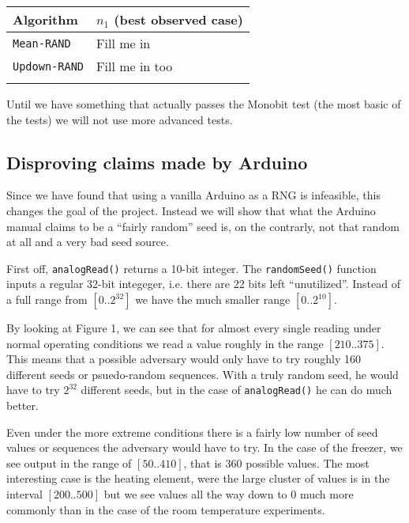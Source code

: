 \documentclass[a4paper]{article}           %
\begin{document}
\begin{centering}
\begin{tabular}{l l}

  Algorithm & $n_1$ (best observed case) \\
  \hline
  \hline
  \texttt{Mean-RAND} & Fill me in \\
  \texttt{Updown-RAND} & Fill me in too \\
  \hline
  & \\
  \end{tabular}
 \end{centering}


Until we have something that actually passes the Monobit test (the most basic of the tests) we will not use more advanced tests. 

\subsection{Disproving claims made by Arduino}

Since we have found that using a vanilla Arduino as a RNG is infeasible, this changes the goal of the project. Instead we will show that what the Arduino manual claims to be a ``fairly random'' seed is, on the contrarly, not that random at all and a very bad seed source. 

First off, \texttt{analogRead()} returns a 10-bit integer. The \texttt{randomSeed()} function inputs a regular 32-bit integeger, i.e. there are 22 bits left ``unutilized''. Instead of a full range from $[0..2^{32}]$ we have the much smaller range $[0..2^{10}]$.

By looking at Figure 1, we can see that for almost every single reading under normal operating conditions we read a value roughly in the range $[210..375]$. This means that a possible adversary would only have to try roughly 160 different seeds or psuedo-random sequences. With a truly random seed, he would have to try $2^{32}$ different seeds, but in the case of \texttt{analogRead()} he can do much better. 

Even under the more extreme conditions there is a fairly low number of seed values or sequences the adversary would have to try. In the case of the freezer, we see output in the range of $[50..410]$, that is 360 possible values. The most interesting case is the heating element, were the large cluster of values is in the interval $[200..500]$ but we see values all the way down to 0 much more commonly than in the case of the room temperature experiments. 
\end{document}

